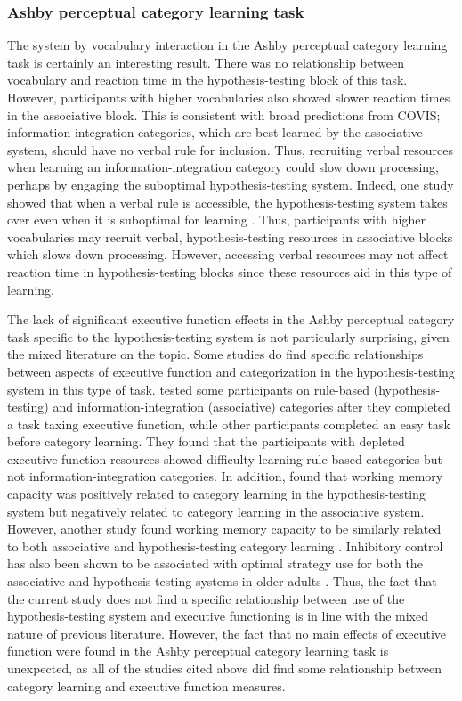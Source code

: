 \documentclass[../dissertation.tex]{subfiles}
\begin{document}
\subsubsection{Ashby perceptual category learning task}
	The system by vocabulary interaction in the Ashby perceptual category learning task is certainly an interesting result. There was no relationship between vocabulary and reaction time in the hypothesis-testing block of this task. However, participants with higher vocabularies also showed slower reaction times in the associative block. This is consistent with broad predictions from COVIS; information-integration categories, which are best learned by the associative system, should have no verbal rule for inclusion. Thus, recruiting verbal resources when learning an information-integration category could slow down processing, perhaps by engaging the suboptimal hypothesis-testing system. Indeed, one study showed that when a verbal rule is accessible, the hypothesis-testing system takes over even when it is suboptimal for learning \citep{Noseworthy2011}. Thus, participants with higher vocabularies may recruit verbal, hypothesis-testing resources in associative blocks which slows down processing. However, accessing verbal resources may not affect reaction time in hypothesis-testing blocks since these resources aid in this type of learning. \par
	The lack of significant executive function effects in the Ashby perceptual category task specific to the hypothesis-testing system is not particularly surprising, given the mixed literature on the topic. Some studies do find specific relationships between aspects of executive function and categorization in the hypothesis-testing system in this type of task. \citet{Minda2015} tested some participants on rule-based (hypothesis-testing) and information-integration (associative) categories after they completed a task taxing executive function, while other participants completed an easy task before category learning. They found that the participants with depleted executive function resources showed difficulty learning rule-based categories but not information-integration categories. In addition, \citet{DeCaro2008} found that working memory capacity was positively related to category learning in the hypothesis-testing system but negatively related to category learning in the associative system. However, another study found working memory capacity to be similarly related to both associative and hypothesis-testing category learning \citep{Lewandowsky2012}. Inhibitory control has also been shown to be associated with optimal strategy use for both the associative and hypothesis-testing systems in older adults \citep{Maddox2010}. Thus, the fact that the current study does not find a specific relationship between use of the hypothesis-testing system and executive functioning is in line with the mixed nature of previous literature. However, the fact that no main effects of executive function were found in the Ashby perceptual category learning task is unexpected, as all of the studies cited above did find some relationship between category learning and executive function measures.  \par
	
\end{document}
